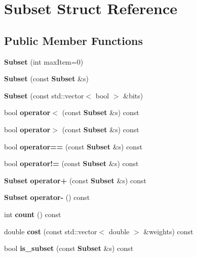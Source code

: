 \section{Subset Struct Reference}
\label{structSubset}
\subsection*{Public Member Functions}
\begin{DoxyCompactItemize}
\item 
{\bfseries Subset} (int max\+Item=0)\label{structSubset_a08f4b42ff7f42a3943224d0d003e6e03}

\item 
{\bfseries Subset} (const {\bf Subset} \&s)\label{structSubset_abf0b9dfab6abc093e2390994e6bcecb3}

\item 
{\bfseries Subset} (const std\+::vector$<$ bool $>$ \&bits)\label{structSubset_aabfc97f4b68c7dfc984b6488f6d5a75c}

\item 
bool {\bfseries operator$<$} (const {\bf Subset} \&s) const \label{structSubset_a4c8589928031aac9d25c29059db923a0}

\item 
bool {\bfseries operator$>$} (const {\bf Subset} \&s) const \label{structSubset_ad0b9406c15f4c0e7d1b7a8212d0fd7c4}

\item 
bool {\bfseries operator==} (const {\bf Subset} \&s) const \label{structSubset_aa80320c63aa36159e85c9cdb19faead3}

\item 
bool {\bfseries operator!=} (const {\bf Subset} \&s) const \label{structSubset_ad41068de94ff063c109f63048631b0cc}

\item 
{\bf Subset} {\bfseries operator+} (const {\bf Subset} \&s) const \label{structSubset_afab6bdecb3c4cc963283a89be5ee9283}

\item 
{\bf Subset} {\bfseries operator-\/} () const \label{structSubset_ad0bc4d41b2b1c4d5a89ed59822b371b0}

\item 
int {\bfseries count} () const \label{structSubset_aa4f1cce13bf3e80e7f2f4e79381270ea}

\item 
double {\bfseries cost} (const std\+::vector$<$ double $>$ \&weights) const \label{structSubset_aa4babe0611921ccf807030970f137803}

\item 
bool {\bfseries is\+\_\+subset} (const {\bf Subset} \&s) const \label{structSubset_ab87530f02b32c881885886f7d0b1bd54}

\end{DoxyCompactItemize}
